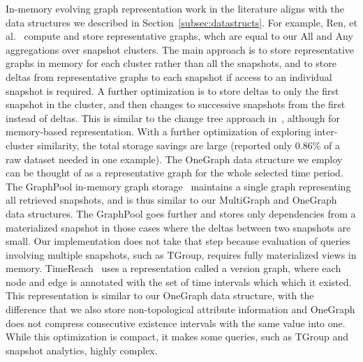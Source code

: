 In-memory evolving graph representation work in the literature aligns
with the data structures we described in
Section~\ref{subsec:datastructs}.  For example, Ren, et
al.~\cite{Ren2011} compute and store representative graphs, whch are
equal to our All and Any aggregations over snapshot clusters.  The
main approach is to store representative graphs in memory for each
cluster rather than all the snapshots, and to store deltas from
representative graphs to each snapshot if access to an individual
snapshot is required.  A further optimization is to store deltas to
only the first snapshot in the cluster, and then changes to successive
snapshots from the first instead of deltas.  This is similar to the
change tree approach in~\cite{Khurana2013}, although for memory-based
representation.  With a further optimization of exploring
inter-cluster similarity, the total storage savings are large
(reported only 0.86\% of a raw dataset needed in one example).  The
OneGraph data structure we employ can be thought of as a
representative graph for the whole selected time period.  The
GraphPool in-memory graph storage~\cite{Khurana2013} maintains a
single graph representing all retrieved snapshots, and is thus similar
to our MultiGraph and OneGraph data structures.  The GraphPool goes
further and stores only dependencies from a materialized snapshot in
those cases where the deltas between two snapshots are small.  Our
implementation does not take that step because evaluation of queries
involving multiple snapshots, such as TGroup, requires fully
materialized views in memory.  TimeReach~\cite{Semertzidis2015} uses a
representation called a version graph, where each node and edge is
annotated with the set of time intervals which which it existed.  This
representation is similar to our OneGraph data structure, with the
difference that we also store non-topological attribute information
and OneGraph does not compress consecutive existence intervals with
the same value into one.  While this optimization is compact, it makes
some queries, such as TGroup and snapshot analytics, highly complex.


